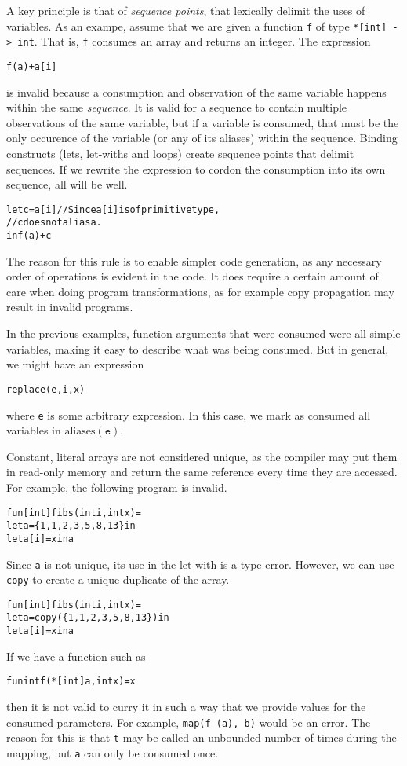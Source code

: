 \documentclass[oneside]{memoir}
\newcommand\aliases[1]{\textrm{aliases}(#1)}
\begin{document}
A key principle is that of \textit{sequence points}, that lexically
delimit the uses of variables.  As an exampe, assume that we are given
a function \texttt{f} of type \texttt{*[int] -> int}.  That is,
\texttt{f} consumes an array and returns an integer.  The expression
\begin{alltt}
  f(a) + a[i]
\end{alltt}
is invalid because a consumption and observation of the same variable
happens within the same \textit{sequence}.  It is valid for a sequence
to contain multiple observations of the same variable, but if a
variable is consumed, that must be the only occurence of the variable
(or any of its aliases) within the sequence.  Binding constructs
(lets, let-withs and loops) create sequence points that delimit
sequences.  If we rewrite the expression to cordon the consumption
into its own sequence, all will be well.
\begin{alltt}
  let c = a[i] // Since a[i] is of primitive type,
               // c does not alias a.
  in f(a) + c
\end{alltt}

The reason for this rule is to enable simpler code generation, as any
necessary order of operations is evident in the code.  It does require
a certain amount of care when doing program transformations, as for
example copy propagation may result in invalid programs.

In the previous examples, function arguments that were consumed were
all simple variables, making it easy to describe what was being
consumed.  But in general, we might have an expression
\begin{alltt}
  replace(e, i, x)
\end{alltt}
where \texttt{e} is some arbitrary expression.  In this case, we mark
as consumed all variables in $\aliases{\texttt{e}}$.

Constant, literal arrays are not considered unique, as the compiler
may put them in read-only memory and return the same reference every
time they are accessed.  For example, the following program is
invalid.
\begin{alltt}
  fun [int] fibs(int i, int x) =
    let a = \{1, 1, 2, 3, 5, 8, 13\} in
    let a[i] = x in a
\end{alltt}
Since \texttt{a} is not unique, its use in the let-with is a type
error.  However, we can use \texttt{copy} to create a unique duplicate
of the array.
\begin{alltt}
  fun [int] fibs(int i, int x) =
    let a = copy(\{1, 1, 2, 3, 5, 8, 13\}) in
    let a[i] = x in a
\end{alltt}

If we have a function such as
\begin{alltt}
  fun int f(*[int] a, int x) = x
\end{alltt}
then it is not valid to curry it in such a way that we provide values
for the consumed parameters.  For example, \texttt{map(f (a), b)}
would be an error.  The reason for this is that \texttt{t} may be
called an unbounded number of times during the mapping, but \texttt{a}
can only be consumed once.
\end{document}
